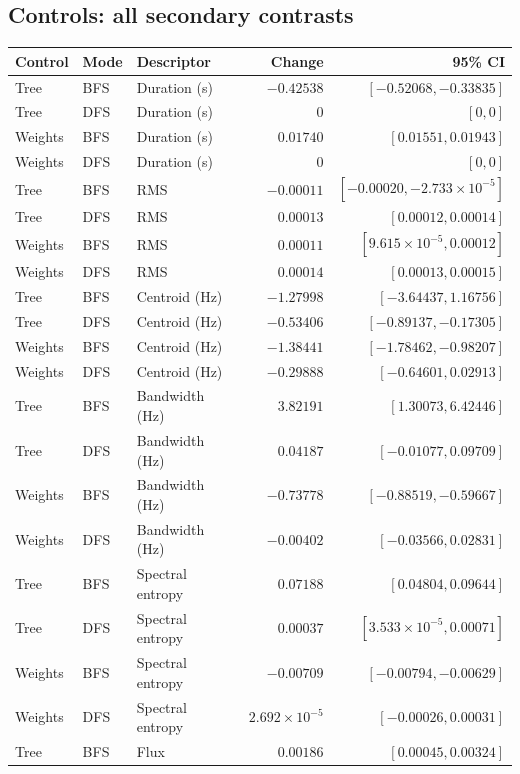 \documentclass[11pt,a4paper]{article}
\begin{document}
\subsection{Controls: all secondary contrasts}
{\small\setlength{\tabcolsep}{5pt}
\begin{longtable}{lllrr}
\toprule
Control & Mode & Descriptor & Change & 95\% CI \\
\midrule\endhead
Tree & BFS & Duration (s) & $-0.42538$ & $[-0.52068, -0.33835]$ \\
Tree & DFS & Duration (s) & $0$ & $[0, 0]$ \\
Weights & BFS & Duration (s) & $0.01740$ & $[0.01551, 0.01943]$ \\
Weights & DFS & Duration (s) & $0$ & $[0, 0]$ \\
Tree & BFS & RMS & $-0.00011$ & $[-0.00020, -2.733\times10^{-5}]$ \\
Tree & DFS & RMS & $0.00013$ & $[0.00012, 0.00014]$ \\
Weights & BFS & RMS & $0.00011$ & $[9.615\times10^{-5}, 0.00012]$ \\
Weights & DFS & RMS & $0.00014$ & $[0.00013, 0.00015]$ \\
Tree & BFS & Centroid (Hz) & $-1.27998$ & $[-3.64437, 1.16756]$ \\
Tree & DFS & Centroid (Hz) & $-0.53406$ & $[-0.89137, -0.17305]$ \\
Weights & BFS & Centroid (Hz) & $-1.38441$ & $[-1.78462, -0.98207]$ \\
Weights & DFS & Centroid (Hz) & $-0.29888$ & $[-0.64601, 0.02913]$ \\
Tree & BFS & Bandwidth (Hz) & $3.82191$ & $[1.30073, 6.42446]$ \\
Tree & DFS & Bandwidth (Hz) & $0.04187$ & $[-0.01077, 0.09709]$ \\
Weights & BFS & Bandwidth (Hz) & $-0.73778$ & $[-0.88519, -0.59667]$ \\
Weights & DFS & Bandwidth (Hz) & $-0.00402$ & $[-0.03566, 0.02831]$ \\
Tree & BFS & Spectral entropy & $0.07188$ & $[0.04804, 0.09644]$ \\
Tree & DFS & Spectral entropy & $0.00037$ & $[3.533\times10^{-5}, 0.00071]$ \\
Weights & BFS & Spectral entropy & $-0.00709$ & $[-0.00794, -0.00629]$ \\
Weights & DFS & Spectral entropy & $2.692\times10^{-5}$ & $[-0.00026, 0.00031]$ \\
Tree & BFS & Flux & $0.00186$ & $[0.00045, 0.00324]$ \\

\end{longtable}}
\end{document}

